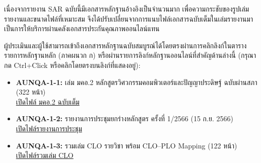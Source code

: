 เนื่องจากรายงาน SAR ฉบับนี้มีเอกสารหลักฐานอ้างอิงเป็นจำนวนมาก เพื่อความกระชับของรูปเล่มรายงานและขนาดไฟล์ที่เหมาะสม จึงได้ปรับเปลี่ยนจากการแนบไฟล์เอกสารฉบับเต็มในเล่มรายงานมาเป็นการให้บริการผ่านคลังเอกสารประกันคุณภาพออนไลน์แทน 

ผู้ประเมินและผู้ใช้สามารถเข้าถึงเอกสารหลักฐานฉบับสมบูรณ์ได้โดยตรงผ่านการคลิกลิงก์ในตารางรายการหลักฐานหลัก (ภาคผนวก ก) หรือผ่านรายการลิงก์หลักฐานออนไลน์ที่สำคัญด้านล่างนี้ (กรุณากด Ctrl+Click หรือคลิกโดยตรงบนลิงก์ที่แสดงอยู่):

\begingroup
\footnotesize
\begin{itemize}[leftmargin=1.5cm, itemsep=6pt]
  \item \textbf{AUNQA-1-1:} เล่ม มคอ.2 หลักสูตรวิศวกรรมคอมพิวเตอร์และปัญญาประดิษฐ์ ฉบับผ่านสภา (322 หน้า)\\
  \href{https://syweb.kidcbc.work/Eviden_aunqa68/\%E0\%B8\%A3\%E0\%B8\%B0\%E0\%B9\%80\%E0\%B8\%9A\%E0\%B8\%B5\%E0\%B8\%A2\%E0\%B8\%9A\%E0\%B8\%82\%E0\%B9\%89\%E0\%B8\%AD\%E0\%B8\%9A\%E0\%B8\%B1\%E0\%B8\%87\%E0\%B8\%84\%E0\%B8\%B1\%E0\%B8\%9A\%E0\%B9\%81\%E0\%B8\%A5\%E0\%B8\%B0\%E0\%B8\%9B\%E0\%B8\%A3\%E0\%B8\%B0\%E0\%B8\%81\%E0\%B8\%B2\%E0\%B8\%A8\%E0\%B8\%AD\%E0\%B8\%B7\%E0\%B9\%88\%E0\%B8\%99\%E0\%B9\%86/AUNQA-1-1_\%E0\%B8\%A1\%E0\%B8\%84\%E0\%B8\%AD2_\%E0\%B8\%9C\%E0\%B9\%88\%E0\%B8\%B2\%E0\%B8\%99\%E0\%B8\%AA\%E0\%B8\%A0\%E0\%B8\%B2_2568.pdf}{เปิดไฟล์ มคอ.2 ฉบับเต็ม}

  \item \textbf{AUNQA-1-2:} รายงานการประชุมยกร่างหลักสูตร ครั้งที่ 1/2566 (15 ก.ย. 2566)\\
  \href{https://syweb.kidcbc.work/Eviden_aunqa68/\%E0\%B8\%AB\%E0\%B8\%A5\%E0\%B8\%B1\%E0\%B8\%81\%E0\%B8\%90\%E0\%B8\%B2\%E0\%B8\%99\%E0\%B8\%81\%E0\%B8\%B2\%E0\%B8\%A3\%E0\%B8\%9B\%E0\%B8\%A3\%E0\%B8\%B0\%E0\%B8\%8A\%E0\%B8\%B8\%E0\%B8\%A1/01_\%E0\%B8\%A3\%E0\%B8\%B0\%E0\%B8\%94\%E0\%B8\%B1\%E0\%B8\%9A\%E0\%B8\%AB\%E0\%B8\%A5\%E0\%B8\%B1\%E0\%B8\%81\%E0\%B8\%AA\%E0\%B8\%B9\%E0\%B8\%95\%E0\%B8\%A3/\%E0\%B8\%81\%E0\%B8\%A1\%E0\%B8\%A8_2566-09-15_\%E0\%B8\%A2\%E0\%B8\%81\%E0\%B8\%A3\%E0\%B9\%88\%E0\%B8\%B2\%E0\%B8\%87\%E0\%B8\%AB\%E0\%B8\%A5\%E0\%B8\%B1\%E0\%B8\%81\%E0\%B8\%AA\%E0\%B8\%B9\%E0\%B8\%95\%E0\%B8\%A3_\%E0\%B8\%84\%E0\%B8\%A3\%E0\%B8\%B1\%E0\%B9\%89\%E0\%B8\%87\%E0\%B8\%97\%E0\%B8\%B5\%E0\%B9\%881.pdf}{เปิดไฟล์รายงานการประชุม}

  \item \textbf{AUNQA-1-3:} รวมเล่ม CLO รายวิชา พร้อม CLO--PLO Mapping (122 หน้า)\\
  \href{https://syweb.kidcbc.work/Eviden_aunqa68/\%E0\%B8\%A3\%E0\%B8\%B0\%E0\%B9\%80\%E0\%B8\%9A\%E0\%B8\%B5\%E0\%B8\%A2\%E0\%B8\%9A\%E0\%B8\%82\%E0\%B9\%89\%E0\%B8\%AD\%E0\%B8\%9A\%E0\%B8\%B1\%E0\%B8\%87\%E0\%B8\%84\%E0\%B8\%B1\%E0\%B8\%9A\%E0\%B9\%81\%E0\%B8\%A5\%E0\%B8\%B0\%E0\%B8\%9B\%E0\%B8\%A3\%E0\%B8\%B0\%E0\%B8\%81\%E0\%B8\%B2\%E0\%B8\%A8\%E0\%B8\%AD\%E0\%B8\%B7\%E0\%B9\%88\%E0\%B8\%99\%E0\%B9\%86/AUNQA-1-3_\%E0\%B8\%A3\%E0\%B8\%A7\%E0\%B8\%A1\%E0\%B9\%80\%E0\%B8\%A5\%E0\%B9\%88\%E0\%B8\%A1CLO_2568.pdf}{เปิดไฟล์รวมเล่ม CLO}


\end{itemize}
